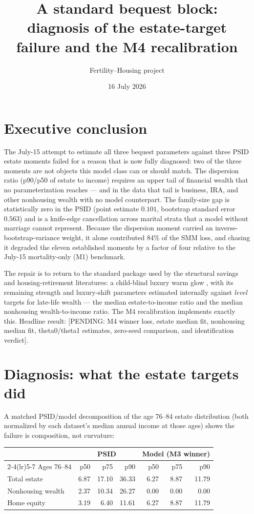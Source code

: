 \documentclass[10pt]{article}
\title{A standard bequest block:\\
diagnosis of the estate-target failure and the M4 recalibration}
\author{Fertility--Housing project}
\date{16 July 2026}
\newcommand{\pending}[1]{\textcolor{red!70!black}{[PENDING: #1]}}
\begin{document}
\maketitle

\section*{Executive conclusion}

The July-15 attempt to estimate all three bequest parameters against three
PSID estate moments failed for a reason that is now fully diagnosed: two of
the three moments are not objects this model class can or should match. The
dispersion ratio (p90/p50 of estate to income) requires an upper tail of
financial wealth that no parameterization reaches --- and in the data that
tail is business, IRA, and other nonhousing wealth with no model counterpart.
The family-size gap is statistically zero in the PSID (point estimate
$0.101$, bootstrap standard error $0.563$) and is a knife-edge cancellation
across marital strata that a model without marriage cannot represent. Because
the dispersion moment carried an inverse-bootstrap-variance weight, it alone
contributed 84\% of the SMM loss, and chasing it degraded the eleven
established moments by a factor of four relative to the July-15 mortality-only
(M1) benchmark.

The repair is to return to the standard package used by the structural
savings and housing-retirement literatures: a child-blind luxury warm glow
\citep{denardi2004,lockwood2018,nakajima2017}, with its remaining strength and
luxury-shift parameters estimated internally against \emph{level} targets for
late-life wealth --- the median estate-to-income ratio and the median
nonhousing wealth-to-income ratio. The M4 recalibration implements exactly
this. Headline result: \pending{M4 winner loss, estate median fit, nonhousing
median fit, theta0/theta1 estimates, zero-seed comparison, and identification
verdict}.

\section{Diagnosis: what the estate targets did}

A matched PSID/model decomposition of the age 76--84 estate distribution
(both normalized by each dataset's median annual income at those ages) shows
the failure is composition, not curvature:

\begin{center}
\begin{tabular}{lrrrrrr}
\toprule
& \multicolumn{3}{c}{PSID} & \multicolumn{3}{c}{Model (M3 winner)} \\
\cmidrule(lr){2-4}\cmidrule(lr){5-7}
Ages 76--84 & p50 & p75 & p90 & p50 & p75 & p90 \\
\midrule
Total estate      & 6.87 & 17.10 & 36.33 & 6.27 & 8.87 & 11.79 \\
Nonhousing wealth & 2.37 & 10.34 & 26.27 & 0.00 & 0.00 & 0.00 \\
Home equity       & 3.19 &  6.40 & 11.61 & 6.27 & 8.87 & 11.79 \\
\bottomrule
\end{tabular}
\end{center}
\end{document}
